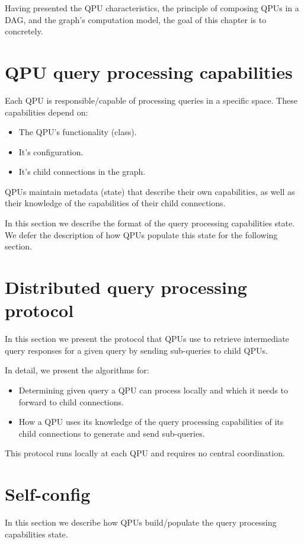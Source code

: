 Having presented the QPU characteristics, the principle of composing QPUs in a DAG, and the graph's computation model,
the goal of this chapter is to concretely.

\section{QPU query processing capabilities}

Each QPU is responsible/capable of processing queries in a specific space. These capabilities depend on:
\begin{itemize}
  \item The QPU's functionality (class).
  \item It's configuration.
  \item It's child connections in the graph.
\end{itemize}

QPUs maintain metadata (state) that describe their own capabilities, as well as their knowledge of the capabilities of
their child connections.

In this section we describe the format of the query processing capabilities state. We defer the description of how QPUs
populate this state for the following section.

\section{Distributed query processing protocol}
In this section we present the protocol that QPUs use to retrieve intermediate query responses for a given query by
sending sub-queries to child QPUs.

In detail, we present the algorithms for:
\begin{itemize}
  \item Determining given query a QPU can process locally and which it needs to forward to child connections.
  \item How a QPU uses its knowledge of the query processing capabilities of its child connections to generate and send
  sub-queries.
\end{itemize}

This protocol runs locally at each QPU and requires no central coordination.

\section{Self-config}
In this section we describe how QPUs build/populate the query processing capabilities state.

